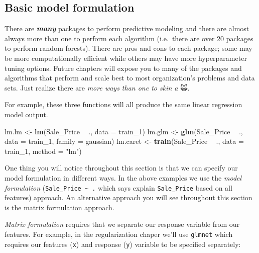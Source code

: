 \documentclass[]{book}
\newenvironment{Shaded}{\begin{snugshade}}{\end{snugshade}}
\newcommand{\DataTypeTok}[1]{\textcolor[rgb]{0.13,0.29,0.53}{#1}}
\newcommand{\DecValTok}[1]{\textcolor[rgb]{0.00,0.00,0.81}{#1}}
\newcommand{\KeywordTok}[1]{\textcolor[rgb]{0.13,0.29,0.53}{\textbf{#1}}}
\newcommand{\NormalTok}[1]{#1}
\newcommand{\OperatorTok}[1]{\textcolor[rgb]{0.81,0.36,0.00}{\textbf{#1}}}
\newcommand{\StringTok}[1]{\textcolor[rgb]{0.31,0.60,0.02}{#1}}
\theoremstyle{definition}
\theoremstyle{definition}
\theoremstyle{definition}
\theoremstyle{remark}
\begin{document}
\hypertarget{model-form}{%
\subsection{Basic model formulation}\label{model-form}}

There are \textbf{\emph{many}} packages to perform predictive modeling
and there are almost always more than one to perform each algorithm
(i.e.~there are over 20 packages to perform random forests). There are
pros and cons to each package; some may be more computationally
efficient while others may have more hyperparameter tuning options.
Future chapters will expose you to many of the packages and algorithms
that perform and scale best to most organization's problems and data
sets. Just realize there are \emph{more ways than one to skin a} 🙀.

For example, these three functions will all produce the same linear
regression model output.

\begin{Shaded}
\begin{Highlighting}[]
\NormalTok{lm.lm    <-}\StringTok{ }\KeywordTok{lm}\NormalTok{(Sale_Price }\OperatorTok{~}\StringTok{ }\NormalTok{., }\DataTypeTok{data =}\NormalTok{ train_}\DecValTok{1}\NormalTok{)}
\NormalTok{lm.glm   <-}\StringTok{ }\KeywordTok{glm}\NormalTok{(Sale_Price }\OperatorTok{~}\StringTok{ }\NormalTok{., }\DataTypeTok{data =}\NormalTok{ train_}\DecValTok{1}\NormalTok{, }\DataTypeTok{family =}\NormalTok{ gaussian)}
\NormalTok{lm.caret <-}\StringTok{ }\KeywordTok{train}\NormalTok{(Sale_Price }\OperatorTok{~}\StringTok{ }\NormalTok{., }\DataTypeTok{data =}\NormalTok{ train_}\DecValTok{1}\NormalTok{, }\DataTypeTok{method =} \StringTok{"lm"}\NormalTok{)}
\end{Highlighting}
\end{Shaded}

One thing you will notice throughout this section is that we can specify
our model formulation in different ways. In the above examples we use
the \emph{model formulation} (\texttt{Sale\_Price\ \textasciitilde{}\ .}
which says explain \texttt{Sale\_Price} based on all features) approach.
An alternative approach you will see throughout this section is the
matrix formulation approach.

\emph{Matrix formulation} requires that we separate our response
variable from our features. For example, in the regularization chaper
we'll use \texttt{glmnet} which requires our features (\texttt{x}) and
response (\texttt{y}) variable to be specified separately:
\end{document}
